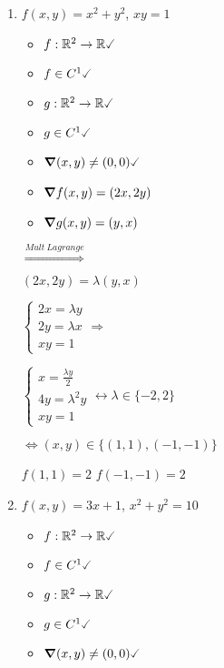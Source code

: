 \documentclass[../practica_06.tex]{subfiles}
\begin{document}
    \begin{enumerate}
        \item $f(x,y) = x^2 + y^2$, $xy=1$
        
            \begin{itemize}
                \item $f: \mathbb{R}^2 \to \mathbb{R} \checked$
                \item $f \in C^1 \checked$
                \item $g: \mathbb{R}^2 \to \mathbb{R} \checked$
                \item $g \in C^1 \checked$
                \item $\grad(x,y) \neq (0,0) \checked$
            \end{itemize}

            \begin{itemize}
                \item $\grad f(x,y) = (2x,2y)$
                \item $\grad g(x,y) = (y,x)$
            \end{itemize} $\stackrel{Mult\ Lagrange}{\Rightarrow}$

            $(2x,2y) = \lambda(y,x)$

            $\left \{\begin{array}{ll}
                2x = \lambda y \\
                2y = \lambda x \\
                xy = 1  
            \end{array} 
            \right. \Rightarrow$ 

            $\left \{\begin{array}{ll}
                x = \frac{\lambda y}{ 2} \\
                4y = \lambda^2y \\
                xy = 1  
            \end{array} 
            \right. \leftrightarrow \lambda \in \{-2,2\}$ 

            $\Leftrightarrow (x,y) \in \{(1,1),(-1,-1)\}$

            $f(1,1) = 2$
            $f(-1,-1) = 2$

        \item $f(x,y) = 3x + 1$, $x^2+y^2=10$

            \begin{itemize}
                \item $f: \mathbb{R}^2 \to \mathbb{R} \checked$
                \item $f \in C^1 \checked$
                \item $g: \mathbb{R}^2 \to \mathbb{R} \checked$
                \item $g \in C^1 \checked$
                \item $\grad(x,y) \neq (0,0) \checked$
            \end{itemize}


\end{enumerate}
\end{document}
